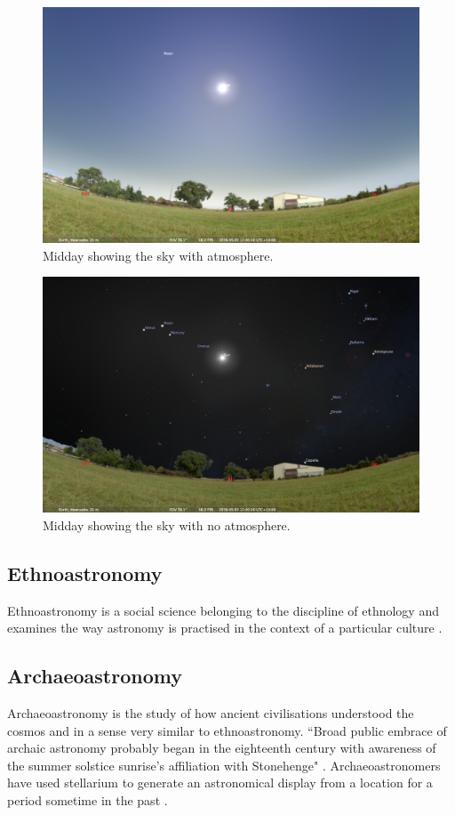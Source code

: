 \begin{figure}[ht]
	\centerline{\includegraphics[width=1\columnwidth]{with-atmosphere.png}}
	\caption{\label{fig_with-atmosphere}{Midday showing the sky with atmosphere.}}
\end{figure}

\begin{figure}[ht]
	\centerline{\includegraphics[width=1\columnwidth]{no-atmosphere.png}}
	\caption{\label{fig_no-atmosphere}{Midday showing the sky with no atmosphere.}}
\end{figure}


\subsection{Ethnoastronomy}
Ethnoastronomy is a social science belonging to the discipline of ethnology and examines the way astronomy is practised in the context of a particular culture \cite{Salt2015}.

\subsection{Archaeoastronomy}
Archaeoastronomy is the study of how ancient civilisations understood the cosmos and in a sense very similar to ethnoastronomy.
``Broad public embrace of archaic astronomy probably began in the eighteenth
century with awareness of the summer solstice sunrise’s affiliation with Stonehenge" \cite[p.~263]{Krupp2015}.
Archaeoastronomers have used stellarium to generate an astronomical display from a location for a period sometime in the past \cite{zotti2014towards}.

